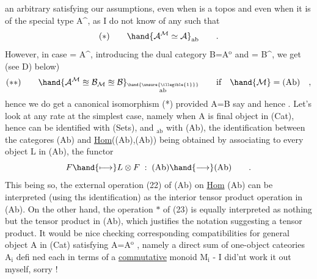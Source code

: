 an arbitrary  satisfying our assumptions, even when  is a topos and
even when it is of the special type A\^{}, as I do not know of any  such
that
\[ (*) \qquad \hand{\mathcal{A}^{\mathcal{M}}\simeq\mathcal{A}}_{\mathrm{ab}} \qquad . \]
However, in case  = A\^{}, introducing the dual category B=A$^{\mathrm{o}}$ and  = B\^{},
we get (see D) below)
\[ (**) \qquad \hand{\mathcal{A}^{\mathcal{M}} \approxeq \mathcal{B}_{\mathcal{M}} \approxeq \mathcal{B}}_{\overset{\hand{\unsure{\illegible{1}}}}{\mathrm{ab}}} \qquad \text{if} \quad \hand{\mathcal{M}} = \text{(Ab)} \quad , \]
hence we do get a canonical isomorphism  (*) provided A=B say
and hence  . Let's look at any rate at the simplest case, namely
when A is  final object in (Cat), hence  can be identified with
(Sets), and $_{\mathrm{ab}}$ with (Ab), the identification between the categores
 (Ab) and \uline{Hom}\hand{$_!$}((Ab),(Ab)) being obtained  by associating
to every object L in (Ab), the functor
\[ F \hand{\longmapsto} L\otimes F \; : \; \text{(Ab)} \hand{\longrightarrow} \text{(Ab)} \qquad . \]
This being so, the external operation (22) of (Ab) on \uline{Hom}\hand{$_!$} \hand{$\approxeq$} (Ab)
can be interpreted (using ths identification) as the interior tensor
product operation in (Ab). On the other hand, the operation $*$ of (23)
is equally interpreted as nothing but the tensor product in (Ab), which
justifies the notation suggesting a tensor product. It would be nice
checking corresponding compatibilities for  general object A in (Cat)
satisfying A=A$^{\mathrm{o}}$ , namely a direct sum of one-object cateories A$_{\mathrm{i}}$ defi%
ned each in terms of a \uline{commutative} monoid M$_{\mathrm{i}}$ - I did'nt work it out
myself, sorry !

